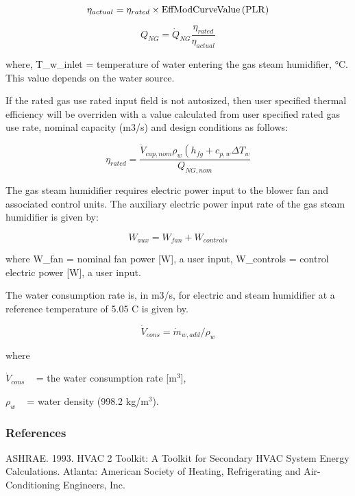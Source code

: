 \begin{equation}
\eta_{actual} = \eta_{rated} \times \rm{EffModCurveValue}\left(PLR\right)
\end{equation}

\begin{equation}
Q_{NG} = \dot{Q}_{NG}\frac{\eta_{rated}}{\eta_{actual}}
\end{equation}

where, T\_w\_inlet = temperature of water entering the gas steam humidifier, °C. This value depends on the water source.

If the rated gas use rated input field is not autosized, then user specified thermal efficiency will be overriden with a value calculated from user specified rated gas use rate, nominal capacity (m3/s) and design conditions as follows:

\begin{equation}
\eta_{rated} = \frac{\dot{V}_{cap,nom} \rho_w \left(h_{fg}+c_{p,w}\Delta T_w}{Q_{NG,nom}}
\end{equation}

The gas steam humidifier requires electric power input to the blower fan and associated control units. The auxiliary electric power input rate of the gas steam humidifier is given by:

\begin{equation}
W_{aux} = W_{fan} + W_{controls}
\end{equation}

where W\_fan = nominal fan power {[}W{]}, a user input, W\_controls = control electric power {[}W{]}, a user input.

The water consumption rate is, in m3/s, for electric and steam humidifier at a reference temperature of 5.05 C is given by.

\begin{equation}
{\dot V_{cons}} = {\dot m_{w,add}}/{\rho_w}
\end{equation}

where

\({\dot V_{cons}}\) ~ = the water consumption rate {[}m\(^{3}\){]},

\({\rho_w}\) ~ = water density (998.2 kg/m\(^{3}\)).

\subsubsection{References}\label{references-003}

ASHRAE. 1993. HVAC 2 Toolkit: A Toolkit for Secondary HVAC System Energy Calculations. Atlanta: American Society of Heating, Refrigerating and Air-Conditioning Engineers, Inc.

